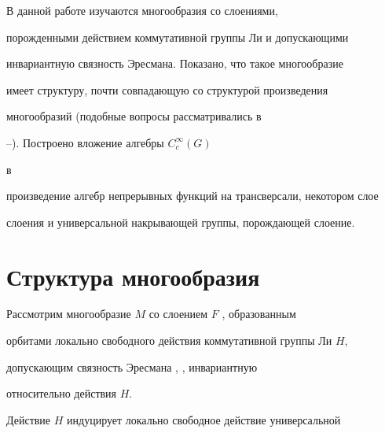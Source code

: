 \date{}




\pagestyle{plain} %







\maketitle


\label{begin}








В данной работе изучаются  многообразия со слоениями,


порожденными действием коммутативной группы Ли и допускающими


инвариантную связность Эресмана. Показано, что такое многообразие


имеет структуру, почти совпадающую со структурой произведения


многообразий (подобные вопросы рассматривались в


\cite{Sh}--\cite{ZhShI}). Построено вложение алгебры $C^{\infty}_c(G)$


\cite{MS} в


произведение алгебр непрерывных функций на трансверсали, некотором слое


слоения и универсальной накрывающей группы, порождающей слоение.





\section{Структура многообразия}





Рассмотрим многообразие $M$ со слоением $F$ \cite{Mo}, образованным


орбитами локально свободного действия коммутативной группы Ли $H$,


допускающим  связность Эресмана \cite{Ehr}, \cite{BH}, инвариантную


относительно действия $H$.





Действие $H$ индуцирует локально свободное действие универсальной


